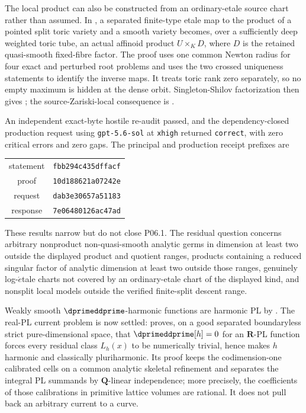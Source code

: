 The local product can also be constructed from an ordinary-etale source
chart rather than assumed.  In
, a separated finite-type etale map to
the product of a pointed split toric variety and a smooth variety becomes,
over a sufficiently deep weighted toric tube, an actual affinoid product
\(
 U\times_KD
\), where \(D\) is the retained quasi-smooth fixed-fibre factor.  The proof
uses one common Newton radius for four exact and perturbed root problems and
uses the two crossed uniqueness statements to identify the inverse maps.
It treats toric rank zero separately, so no empty maximum is hidden at the
dense orbit.  Singleton-Shilov factorization then gives
; the source-Zariski-local
consequence is .

An independent exact-byte hostile re-audit passed, and the dependency-closed
production request using \texttt{gpt-5.6-sol} at \texttt{xhigh} returned
\texttt{correct}, with zero critical errors and zero gaps.  The principal
and production receipt prefixes are
\begin{center}
  \small
  \begin{tabular}{@{}cc@{}}
    statement & \texttt{fbb294c435dffacf} \\
    proof & \texttt{10d188621a07242e} \\
    request & \texttt{dab3e30657a51183} \\
    response & \texttt{7e06480126ac47ad}
  \end{tabular}
\end{center}

These results narrow but do not close P06.1.  The residual question concerns
arbitrary nonproduct non-quasi-smooth analytic germs in dimension at least
two outside the displayed product and quotient ranges, products containing
a reduced singular factor of analytic dimension at least two outside those
ranges, genuinely log-\(\acute{e}\)tale charts not covered by an
ordinary-etale chart of the displayed kind, and nonsplit local models outside
the verified finite-split descent range.

Weakly smooth \(\dprimeddprime\)-harmonic functions are harmonic PL by
\cite[Proposition~10.17]{GJR26}.  The real-PL current problem is now settled:
 proves, on a good separated
boundaryless strict pure-dimensional space, that
\(\dprimeddprime[h]=0\) for an $\mathbf R$-PL function forces every residual
class $L_h(x)$ to be numerically trivial, hence makes $h$ harmonic and
classically pluriharmonic.  Its proof keeps the codimension-one calibrated
cells on a common analytic skeletal refinement and separates the
integral PL summands by $\mathbf Q$-linear independence; more precisely, the
coefficients of those calibrations in primitive lattice volumes are rational.
It does not pull back an arbitrary current to a curve.

